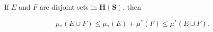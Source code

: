 If $E$ and $F$ are disjoint sets in $\mathbf{H}(\mathbf{S})$, then

$$\mu_*(E \cup F) \leq \mu_*(E) + \mu^*(F) \leq \mu^*(E \cup F).$$
